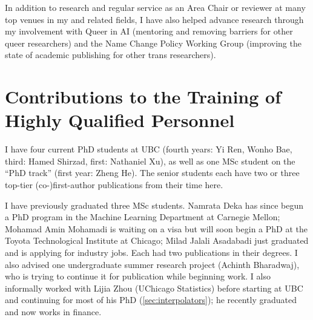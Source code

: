\documentclass[12pt]{article}
\begin{document}
In addition to research and regular service as an Area Chair or reviewer at many top venues in my and related fields,
I have also helped advance research through my involvement with
Queer in AI (mentoring and removing barriers for other queer researchers)
and the Name Change Policy Working Group (improving the state of academic publishing for other trans researchers).

\clearpage
\section{Contributions to the Training of Highly Qualified Personnel}

I have four current PhD students at UBC
(fourth years: Yi Ren, Wonho Bae, third: Hamed Shirzad, first: Nathaniel Xu),
as well as one MSc student on the ``PhD track'' (first year: Zheng He).
The senior students each have two or three top-tier (co-)first-author publications from their time here.

I have previously graduated three MSc students.
Namrata Deka has since begun a PhD program in the Machine Learning Department at Carnegie Mellon;
Mohamad Amin Mohamadi is waiting on a visa but will soon begin a PhD at the Toyota Technological Institute at Chicago;
Milad Jalali Asadabadi just graduated and is applying for industry jobs.
Each had two publications in their degrees.
I also advised one undergraduate summer research project (Achinth Bharadwaj),
who is trying to continue it for publication while beginning work.
I also informally worked with Lijia Zhou (UChicago Statistics) before starting at UBC and continuing for most of his PhD (\cref{sec:interpolators}); he recently graduated and now works in finance.
\end{document}

